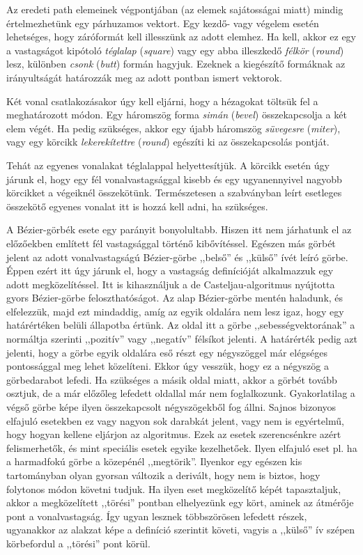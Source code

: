 \documentclass[12pt]{report}
\theoremstyle{definition}
\newcommand{\inenglish}[1]{\textsl{#1}}
\begin{document}
Az eredeti path elemeinek végpontjában (az elemek sajátosságai miatt) mindig
értelmezhetünk egy párhuzamos vektort. Egy kezdő- vagy végelem esetén
lehetséges, hogy záróformát kell illesszünk az adott elemhez. Ha kell, akkor ez
egy a vastagságot kipótoló \emph{téglalap} (\inenglish{square}) vagy egy abba
illeszkedő \emph{félkör} (\inenglish{round}) lesz, különben \emph{csonk}
(\inenglish{butt}) formán hagyjuk. Ezeknek a kiegészítő formáknak az
irányultságát határozzák meg az adott pontban ismert vektorok.

Két vonal csatlakozásakor úgy kell eljárni, hogy a hézagokat töltsük fel a
meghatározott módon. Egy háromszög forma \emph{simán} (\inenglish{bevel})
összekapcsolja a két elem végét. Ha pedig szükséges, akkor egy újabb háromszög
\emph{süvegesre} (\inenglish{miter}), vagy egy körcikk \emph{lekerekítettre}
(\inenglish{round}) egészíti ki az összekapcsolás pontját.

Tehát az egyenes vonalakat téglalappal helyettesítjük. A körcikk esetén úgy
járunk el, hogy egy fél vonalvastagsággal kisebb és egy ugyanennyivel nagyobb
körcikket a végeiknél összekötünk. Természetesen a szabványban leírt esetleges
összekötő egyenes vonalat itt is hozzá kell adni, ha szükséges.

A Bézier-görbék esete egy parányit bonyolultabb. Hiszen itt nem járhatunk el az
előzőekben említett fél vastagsággal történő kibővítéssel. Egészen más görbét
jelent az adott vonalvastagságú Bézier-görbe ,,belső'' és ,,külső'' ívét leíró
görbe. Éppen ezért itt úgy járunk el, hogy a vastagság definícióját alkalmazzuk
egy adott megközelítéssel. Itt is kihasználjuk a de Casteljau-algoritmus
nyújtotta gyors Bézier-görbe feloszthatóságot. Az alap Bézier-görbe mentén
haladunk, és elfelezzük, majd ezt mindaddig, amíg az egyik oldalára nem lesz
igaz, hogy egy határértéken belüli állapotba értünk. Az oldal itt a görbe
,,sebességvektorának'' a normáltja szerinti ,,pozitív'' vagy ,,negatív''
félsíkot jelenti. A határérték pedig azt jelenti, hogy a görbe egyik oldalára
eső részt egy négyszöggel már elégséges pontossággal meg lehet közelíteni.
Ekkor úgy vesszük, hogy ez a négyszög a görbedarabot lefedi. Ha szükséges a
másik oldal miatt, akkor a görbét tovább osztjuk, de a már előzőleg lefedett
oldallal már nem foglalkozunk. Gyakorlatilag a végső görbe képe ilyen
összekapcsolt négyszögekből fog állni. Sajnos bizonyos elfajuló esetekben ez
vagy nagyon sok darabkát jelent, vagy nem is egyértelmű, hogy hogyan kellene
eljárjon az algoritmus. Ezek az esetek szerencsénkre azért felismerhetők, és
mint speciális esetek egyike kezelhetőek. Ilyen elfajuló eset pl. ha a
harmadfokú görbe a közepénél ,,megtörik''. Ilyenkor egy egészen kis
tartományban olyan gyorsan változik a derivált, hogy nem is biztos, hogy
folytonos módon követni tudjuk. Ha ilyen eset megközelítő képét tapasztaljuk,
akkor a megközelített ,,törési'' pontban elhelyezünk egy kört, aminek az
átmérője pont a vonalvastagság. Így ugyan lesznek többszörösen lefedett részek,
ugyanakkor az alakzat képe a definíció szerintit követi, vagyis a ,,külső'' ív
szépen körbefordul a ,,törési'' pont körül.
\end{document}
